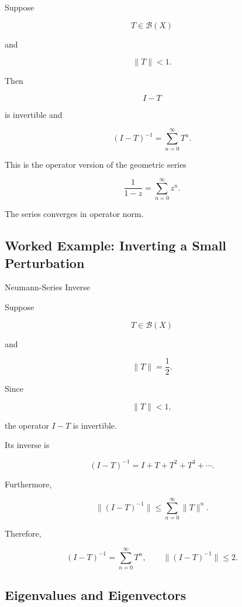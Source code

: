 Suppose

\[
T\in\mathcal{B}(X)
\]

and

\[
\boxed{
\|T\|<1.
}
\]

Then

\[
I-T
\]

is invertible and

\[
\boxed{
(I-T)^{-1}
=
\sum_{n=0}^{\infty}T^n.
}
\]

This is the operator version of the geometric series

\[
\frac{1}{1-z}
=
\sum_{n=0}^{\infty}z^n.
\]

The series converges in operator norm.

\subsection{Worked Example: Inverting a Small Perturbation}
\label{subsec:worked-neumann}

\begin{workedexamplebox}{Neumann-Series Inverse}

Suppose

\[
T\in\mathcal{B}(X)
\]

and

\[
\|T\|=\frac12.
\]

Since

\[
\|T\|<1,
\]

the operator \(I-T\) is invertible.

Its inverse is

\[
(I-T)^{-1}
=
I+T+T^2+T^3+\cdots.
\]

Furthermore,

\[
\|(I-T)^{-1}\|
\leq
\sum_{n=0}^{\infty}\|T\|^n.
\]

Therefore,

\begin{answerbox}
\[
\boxed{
(I-T)^{-1}
=
\sum_{n=0}^{\infty}T^n,
\qquad
\|(I-T)^{-1}\|
\leq2.
}
\]
\end{answerbox}
\end{workedexamplebox}

\subsection{Eigenvalues and Eigenvectors}
\label{subsec:operator-eigenvalues}

